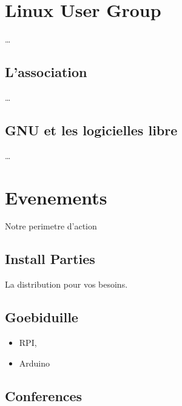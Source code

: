 
\section*{Linux User Group}

\dots

\subsection{L'association}

\dots

\subsection*{GNU et les logicielles libre}

\dots

\section*{Evenements} 

Notre perimetre d'action

\subsection*{Install Parties}

La distribution pour vos besoins.

\subsection*{Goebiduille}

\begin{itemize}
\item RPI,
\item Arduino
\end{itemize}

\subsection*{Conferences}